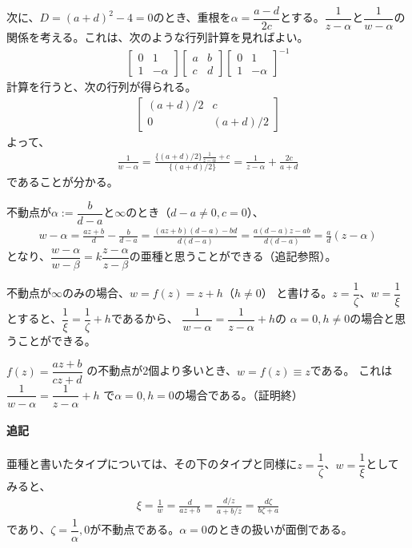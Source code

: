 次に、$D=(a+d)^2-4=0$のとき、重根を$\alpha=\dfrac{a-d}{2c}$とする。$\dfrac{1}{z-\alpha}$と$\dfrac{1}{w-\alpha}$の関係を考える。これは、次のような行列計算を見ればよい。
\begin{align*}
    \begin{bmatrix}
        0&1\\
        1&-\alpha
    \end{bmatrix}
    \begin{bmatrix}
        a&b\\
        c&d
    \end{bmatrix}
    \begin{bmatrix}
        0&1\\
        1&-\alpha
    \end{bmatrix}^{-1}
\end{align*}
計算を行うと、次の行列が得られる。
\begin{align*}
    \begin{bmatrix}
        (a+d)/2&c\\
        0&(a+d)/2
    \end{bmatrix}
\end{align*}
よって、
\begin{align*}
    \frac{1}{w-\alpha}
    =\frac{\{(a+d)/2\}\frac{1}{z-\alpha}+c}{\{(a+d)/2\}}
    =\frac{1}{z-\alpha}+\frac{2c}{a+d}
\end{align*}
であることが分かる。

不動点が$\alpha:=\dfrac{b}{d-a}$と$\infty$のとき（$d-a\neq0,c=0$）、
\begin{align*}
    w-\alpha
    =\frac{az+b}{d}-\frac{b}{d-a}
    =\frac{(az+b)(d-a)-bd}{d(d-a)}
    =\frac{a(d-a)z-ab}{d(d-a)}
    =\frac{a}{d}(z-\alpha)
\end{align*}
となり、$\dfrac{w-\alpha}{w-\beta}=k\dfrac{z-\alpha}{z-\beta}$の亜種と思うことができる（追記参照）。

不動点が$\infty$のみの場合、$w=f(z)=z+h$（$h\neq0$）
と書ける。$z=\dfrac{1}{\zeta}$、$w=\dfrac{1}{\xi}$とすると、$\dfrac{1}{\xi}=\dfrac{1}{\zeta}+h$であるから、
$\dfrac{1}{w-\alpha}=\dfrac{1}{z-\alpha}+h$の
$\alpha=0,h\neq0$の場合と思うことができる。

$f(z)=\dfrac{az+b}{cz+d}$
の不動点が2個より多いとき、$w=f(z)\equiv z$である。
これは
$\dfrac{1}{w-\alpha}=\dfrac{1}{z-\alpha}+h$
で$\alpha=0,h=0$の場合である。（証明終）

\paragraph{追記}
亜種と書いたタイプについては、その下のタイプと同様に$z=\dfrac{1}{\zeta}$、$w=\dfrac{1}{\xi}$としてみると、
\begin{align*}
    \xi
    =\frac{1}{w}
    =\frac{d}{az+b}
    =\frac{d/z}{a+b/z}
    =\frac{d\zeta}{b\zeta+a}
\end{align*}
であり、$\zeta=\dfrac{1}{\alpha},0$が不動点である。$\alpha=0$のときの扱いが面倒である。

